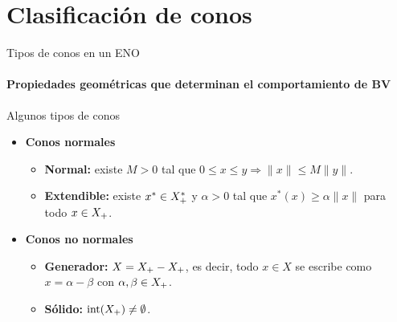 \section{Clasificación de conos}

\begin{frame}{Tipos de conos en un ENO}
\framesubtitle{Propiedades geométricas que determinan el comportamiento de BV}

\begin{block}{}
\centering
\large Algunos tipos de conos
\end{block}

\begin{itemize}
    \item \textbf{Conos normales}
    \begin{itemize}
        \item[$\ast$] \textbf{Normal:} existe $M>0$ tal que
            $0 \le x \le y \Rightarrow \|x\| \le M\|y\|$.
        \item[$\ast$] \textbf{Extendible:} existe $x^{*}\in X_{+}^{*}$ y $\alpha>0$
            tal que $x^{*}(x)\ge\alpha\|x\|$ para todo $x\in X_{+}$.
    \end{itemize}
    \item \textbf{Conos no normales}
    \begin{itemize}
        \item[$\ast$] \textbf{Generador:} $X = X_{+} - X_{+}$, es decir, todo
            $x\in X$ se escribe como $x=\alpha-\beta$ con $\alpha,\beta\in X_{+}$.
        \item[$\ast$] \textbf{Sólido:} $\operatorname{int}(X_{+})\ne\emptyset$.
    \end{itemize}
\end{itemize}


\end{frame}


